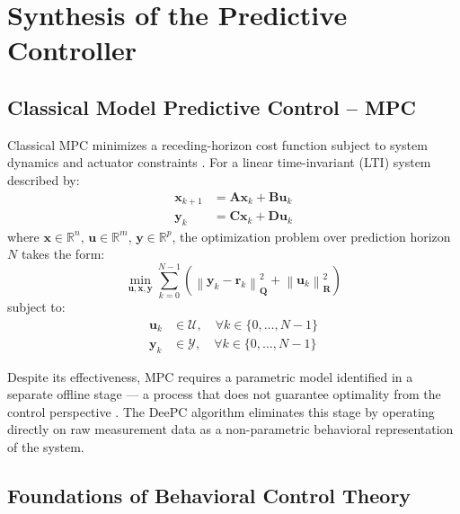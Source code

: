 \chapter{Synthesis of the Predictive Controller}
\label{ch:deepc}

\section{Classical Model Predictive Control -- MPC}
\label{subs:mpc}

Classical MPC minimizes a receding-horizon cost function subject to system dynamics and actuator constraints \cite{nmpc}. For a linear time-invariant (LTI) system described by:
\begin{align}
    \boldsymbol{x}_{k+1} &= \boldsymbol{A}\boldsymbol{x}_k + \boldsymbol{B} \boldsymbol{u}_k 
    \label{eq:statempc}
    \\
    \boldsymbol{y}_k &= \boldsymbol{C} \boldsymbol{x}_k + \boldsymbol{D} \boldsymbol{u}_k
    \label{eq:outmpc}
\end{align}
where $\boldsymbol{x} \in \mathbb{R}^n$, $\boldsymbol{u} \in \mathbb{R}^m$, $\boldsymbol{y} \in \mathbb{R}^p$, the optimization problem over prediction horizon $N$ takes the form:
\begin{equation}
    \min_{\boldsymbol{u},\boldsymbol{x},\boldsymbol{y}} \sum_{k=0}^{N-1} \left( \left\| \boldsymbol{y}_k - \boldsymbol{r}_{k} \right\|_{\boldsymbol{Q}}^2 + \left\| \boldsymbol{u}_k \right\|_{\boldsymbol{R}}^2 \right)
    \label{eq:costmpc}
\end{equation}
subject to:
\begin{align}
    \boldsymbol{u}_k &\in \mathcal{U}, \quad \forall k \in \{0, \ldots, N-1\}
    \label{eq:umpc}
    \\
    \boldsymbol{y}_k &\in \mathcal{Y}, \quad \forall k \in \{0, \ldots, N-1\}
    \label{eq:ympc}
\end{align}

Despite its effectiveness, MPC requires a parametric model identified in a separate offline stage — a process that does not guarantee optimality from the control perspective \cite{markovsky2023data}. The DeePC algorithm eliminates this stage by operating directly on raw measurement data as a non-parametric behavioral representation of the system.

\section{Foundations of Behavioral Control Theory}

